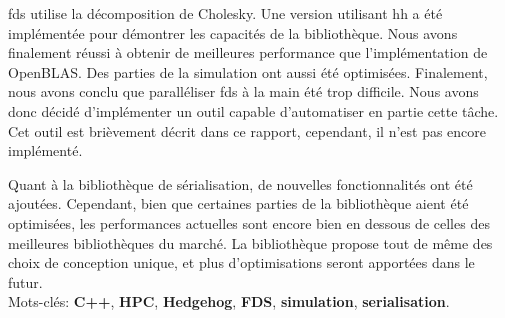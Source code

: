 \gls{fds} utilise la décomposition de Cholesky. Une version utilisant \gls{hh} a
été implémentée pour démontrer les capacités de la bibliothèque. Nous avons
finalement réussi à obtenir de meilleures performance que l'implémentation de
OpenBLAS. Des parties de la simulation ont aussi été optimisées. Finalement,
nous avons conclu que paralléliser \gls{fds} à la main été trop difficile. Nous
avons donc décidé d'implémenter un outil capable d'automatiser en partie cette
tâche. Cet outil est brièvement décrit dans ce rapport, cependant, il n'est pas
encore implémenté.

Quant à la bibliothèque de sérialisation, de nouvelles fonctionnalités ont été
ajoutées. Cependant, bien que certaines parties de la bibliothèque aient été
optimisées, les performances actuelles sont encore bien en dessous de celles des
meilleures bibliothèques du marché. La bibliothèque propose tout de même des
choix de conception unique, et plus d'optimisations seront apportées dans le
futur.\\

Mots-clés: \textbf{C++}, \textbf{HPC}, \textbf{Hedgehog}, \textbf{FDS},
\textbf{simulation}, \textbf{serialisation}.
